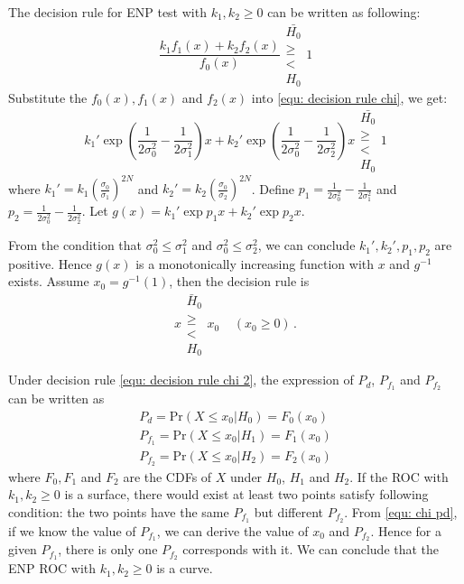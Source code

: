 \documentclass[12pt,journal,a4paper,twoside,onecolumn,draft]{IEEEtran}
\begin{document}
\begin{spacing}{2.5}
The decision rule for ENP test with $k_1, k_2 \geq 0$ can be written as following:
\begin{equation}
\label{equ: decision rule chi}
  \frac{k_1f_1(x) + k_2f_2(x)}{f_0(x)} \substack{\bar{H_0} \\ \geq \\ < \\ H_0} 1
\end{equation}
Substitute the $f_0(x), f_1(x)$ and $f_2(x)$ into \eqref{equ: decision rule chi}, we get:
\begin{equation}
  \label{equ: decision rule chi 1}
  k_1'\exp{(\frac{1}{2\sigma_0^2} - \frac{1}{2\sigma_1^2})x} + k_2'\exp{(\frac{1}{2\sigma_0^2} - \frac{1}{2\sigma_2^2})x} \substack{\bar{H_0} \\ \geq \\ < \\ H_0} 1
\end{equation}
where $k_1' = k_1(\frac{\sigma_0}{\sigma_1})^{2N}$ and $k_2' = k_2(\frac{\sigma_0}{\sigma_2})^{2N}$. Define $p_1 = \frac{1}{2\sigma_0^2} - \frac{1}{2\sigma_1^2}$ and $p_2 = \frac{1}{2\sigma_0^2} - \frac{1}{2\sigma_2^2}$. Let $g(x) =  k_1'\exp{p_1x}+k_2'\exp{p_2x}$.

From the condition that $\sigma_0^2 \leq \sigma_1^2$ and $\sigma_0^2 \leq \sigma_2^2$,  we can conclude $k_1', k_2', p_1, p_2$ are positive. Hence $g(x)$ is a monotonically increasing function with $x$ and $g^{-1}$ exists. Assume $x_0 = g^{-1}(1)$, then the decision rule is
\begin{equation}
  \label{equ: decision rule chi 2}
  x \substack{\bar{H}_0 \\ \geq \\ < \\ H_0} x_0\;\;\;\;(x_0 \geq 0)\,.
\end{equation}

Under decision rule \eqref{equ: decision rule chi 2}, the expression of $P_d$, $P_{f_1}$ and $P_{f_2}$ can be written as
\begin{equation}
\label{equ: chi pd}
  \begin{split}
    P_d = \text{Pr}(X \leq x_0 | H_0) = F_0(x_0)\\
        P_{f_1} = \text{Pr}(X \leq x_0 | H_1) = F_1(x_0)\\
            P_{f_2} = \text{Pr}(X \leq x_0 | H_2) = F_2(x_0)
  \end{split}
\end{equation}
where $F_0, F_1$ and  $F_2$  are the CDFs of $X$ under $H_0$, $H_1$ and $H_2$.
If the ROC with $k_1, k_2 \geq 0$ is a surface, there would exist at least two points satisfy following condition: the two points have the same $P_{f_1}$ but different $P_{f_2}$.
From \eqref{equ: chi pd}, if we know the value of $P_{f_1}$,  we can derive the value of $x_0$ and $P_{f_2}$. Hence for a given $P_{f_1}$, there is only one $P_{f_2}$ corresponds with it. We can conclude that the ENP ROC with $k_1, k_2 \geq 0$ is a curve.


\end{spacing}
\end{document}
